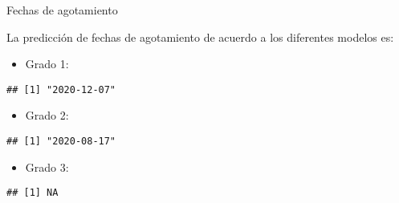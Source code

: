\documentclass[ignorenonframetext,]{beamer}
\providecommand{\tightlist}{%
  \setlength{\itemsep}{0pt}\setlength{\parskip}{0pt}}
\begin{document}
\begin{frame}[fragile]{Fechas de agotamiento}
\protect\hypertarget{fechas-de-agotamiento}{}

La predicción de fechas de agotamiento de acuerdo a los diferentes
modelos es:

\begin{itemize}
\tightlist
\item
  Grado 1:
\end{itemize}

\begin{verbatim}
## [1] "2020-12-07"
\end{verbatim}

\begin{itemize}
\tightlist
\item
  Grado 2:
\end{itemize}

\begin{verbatim}
## [1] "2020-08-17"
\end{verbatim}

\begin{itemize}
\tightlist
\item
  Grado 3:
\end{itemize}

\begin{verbatim}
## [1] NA
\end{verbatim}

\end{frame}
\end{document}
